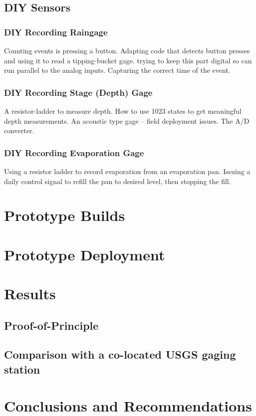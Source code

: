 \documentclass[11pt]{article}
\begin{document}
\subsection{DIY Sensors}
\subsubsection{DIY Recording Raingage}
Counting events is pressing a button.  Adapting code that detects button presses and using it to read a tipping-bucket gage.
trying to keep this part digital so can run parallel to the analog inputs. Capturing the correct time of the event. \\
\subsubsection{DIY Recording Stage (Depth) Gage}
A resistor-ladder to measure depth.   
How to use 1023 states to get meaningful depth measurements.
An acoustic type gage -- field deployment issues. 
The A/D converter.\\
\subsubsection{DIY Recording Evaporation Gage}
Using a resistor ladder to record evaporation from an evaporation pan.
Issuing a daily control signal to refill the pan to desired level, then stopping the fill.
\section{Prototype Builds}
\section{Prototype Deployment}
\section{Results}
\subsection{Proof-of-Principle}
\subsection{Comparison with a co-located USGS gaging station}
\section{Conclusions and Recommendations}
\end{document}
